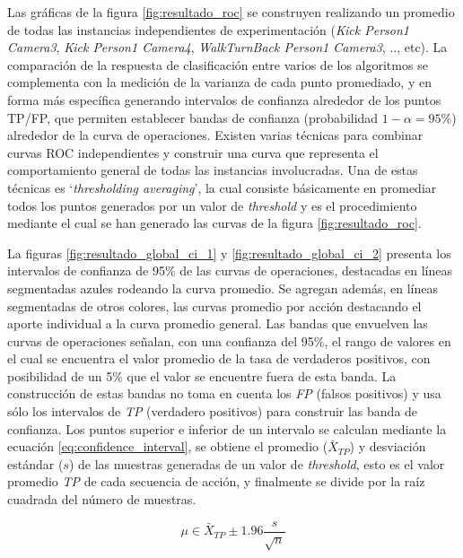 Las gráficas de la figura \ref{fig:resultado_roc} se construyen realizando un promedio de todas las instancias independientes de experimentación (\textit{Kick Person1 Camera3}, \textit{Kick Person1 Camera4}, \textit{WalkTurnBack Person1 Camera3}, .., etc). La comparación de la respuesta de clasificación entre varios de los algoritmos se complementa con la medición de la varianza de cada punto promediado, y en forma más específica generando intervalos de confianza \cite{confidence_bands_macskassy_2004} alrededor de los puntos TP/FP, que permiten establecer bandas de confianza (probabilidad $1-\alpha=95\%$) alrededor de la curva de operaciones. Existen varias técnicas \cite{fawcett_roc_analysis_2006} para combinar curvas ROC independientes y construir una curva que representa el comportamiento general de todas las instancias involucradas. Una de estas técnicas es `\textit{thresholding averaging}', la cual consiste básicamente en promediar todos los puntos generados por un valor de \textit{threshold} y es el procedimiento mediante el cual se han generado las curvas de la figura \ref{fig:resultado_roc}.  

La figuras \ref{fig:resultado_global_ci_1} y \ref{fig:resultado_global_ci_2} presenta los intervalos de confianza de 95\% de las curvas de operaciones, destacadas en líneas segmentadas azules rodeando la curva promedio. Se agregan además, en líneas segmentadas de otros colores, las curvas promedio por acción destacando el aporte individual a la curva promedio general. Las bandas que envuelven las curvas de operaciones señalan, con una confianza del 95\%, el rango de valores en el cual se encuentra el valor promedio de la tasa de verdaderos positivos, con posibilidad de un 5\% que el valor se encuentre fuera de esta banda. La construcción de estas bandas no toma en cuenta los \textit{FP} (falsos positivos) y usa sólo los intervalos de \textit{TP} (verdadero positivos) para construir las banda de confianza. Los puntos superior e inferior de un intervalo se calculan mediante la ecuación \ref{eq:confidence_interval}, se obtiene el promedio ($\bar{X}_{TP}$) y desviación estándar ($s$) de las muestras generadas de un valor de \textit{threshold}, esto es el valor promedio \textit{TP} de cada secuencia de acción, y finalmente se divide por la raíz cuadrada del número de muestras.

\begin{equation} \label{eq:confidence_interval}
\mu \in \bar{X}_{TP} \pm 1.96 \frac{s}{\sqrt{n}} 
\end{equation}

